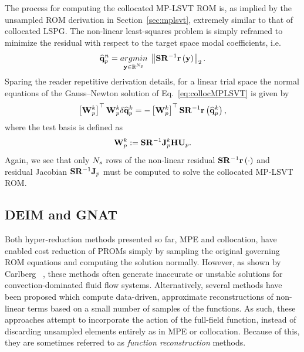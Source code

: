 The process for computing the collocated MP-LSVT ROM is, as implied by the unsampled ROM derivation in Section~\ref{sec:mplsvt}, extremely similar to that of collocated LSPG. The non-linear least-squares problem is simply reframed to minimize the residual with respect to the target space modal coefficients, i.e.
%
\begin{equation}\label{eq:collocMPLSVT}
	\primVecCoef^{\timeIdx} = \argmin{\dummyVec \inROne{\numPrimModes}} \left\Vert \sampMat \resScaleInv \resFunc{\dummyVec} \right\Vert_2.
\end{equation}
%
Sparing the reader repetitive derivation details, for a linear trial space the normal equations of the Gauss--Newton solution of Eq.~\ref{eq:collocMPLSVT} is given by
%
\begin{equation}
    \left[\testBasisPrim^{\newtonIdx}\right]^\top \testBasisPrim^{\newtonIdx} \delta \primVecCoef^{\newtonIdx} = -\left[\testBasisPrim^{\newtonIdx}\right]^\top \sampMat \resScaleInv \resFunc{\primVecCoef^{\newtonIdx}},
\end{equation}
%
where the test basis is defined as
%
\begin{equation}
    \testBasisPrim^\newtonIdx \defEq \sampMat \resScaleInv \jacobPrim^\newtonIdx \primScale \primTrial.
\end{equation}
%
Again, we see that only $N_s$ rows of the non-linear residual $\sampMat \resScaleInv \resFunc{\cdot}$ and residual Jacobian $\sampMat \resScaleInv \jacobPrim$ must be computed to solve the collocated MP-LSVT ROM.

\subsection{DEIM and GNAT}\label{subsec:gappyPOD}
%
Both hyper-reduction methods presented so far, MPE and collocation, have enabled cost reduction of PROMs simply by sampling the original governing ROM equations and computing the solution normally. However, as shown by Carlberg ~\cite{Carlberg2013}, these methods often generate inaccurate or unstable solutions for convection-dominated fluid flow systems. Alternatively, several methods have been proposed which compute data-driven, approximate reconstructions of non-linear terms based on a small number of samples of the functions. As such, these approaches attempt to incorporate the action of the full-field function, instead of discarding unsampled elements entirely as in MPE or collocation. Because of this, they are sometimes referred to as \textit{function reconstruction} methods.

